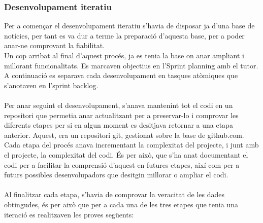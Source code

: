 \documentclass[12pt,a4paper,openright,oneside]{article}
\numberwithin{equation}{section}
\theoremstyle{definition}
\begin{document}
\subsubsection*{Desenvolupament iteratiu}
Per a començar el desenvolupament iteratiu s'havia de disposar ja d'una base de notícies, per tant es va dur a terme la preparació d'aquesta base, per a poder anar-ne comprovant la fiabilitat.\\
Un cop arribat al final d'aquest procés, ja es tenia la base on anar ampliant i millorant funcionalitats. Es marcaven objectius en l'Sprint planning amb el tutor. A continuació es separava cada desenvolupament en tasques atòmiques que s'anotaven en l'sprint backlog.\\\\
Per anar seguint el desenvolupament, s'anava mantenint tot el codi en un repositori que permetia anar actualitzant per a preservar-lo i comprovar les diferents etapes per si en algun moment es desitjava retornar a una etapa anterior. Aquest, era un repositori git, gestionat sobre la base de github.com.\\
Cada etapa del procés anava incrementant la complexitat del projecte, i junt amb el projecte, la complexitat del codi. És per això, que s'ha anat documentant el codi per a facilitar la comprensió d'aquest en futures etapes, així com per a futurs possibles desenvolupadors que desitgin millorar o ampliar el codi.\\\\
Al finalitzar cada etapa, s'havia de comprovar la veracitat de les dades obtingudes, és per això que per a cada una de les tres etapes que tenia una iteració es realitzaven les proves següents:
\end{document}

